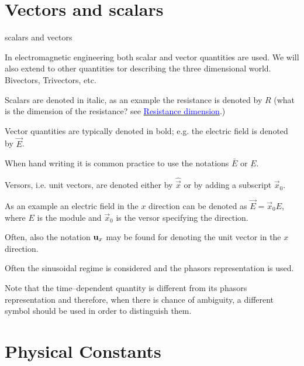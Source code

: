 \documentclass[10pt]{beamer}
\begin{document}
\section{Vectors and scalars}
\begin{frame}[fragile]{scalars and vectors}

In electromagnetic engineering both scalar and vector quantities are used. 
\alert{We will also extend to other quantities tor describing the three dimensional world. Bivectors, Trivectors, etc.}

Scalars are denoted in italic, as an example the resistance is denoted by $R$
(what is the dimension of the resistance? see
\href{http://www.ebyte.it/library/educards/sidimensions/SiDimensionsAlfaList.html}{\textcolor{blue}{Resistance dimension}}.)

Vector quantities are typically denoted in bold; e.g. the electric field is denoted by 
$\vec{E}$. 

When hand writing it is common practice to use the notations  $\bar{E}$ or $\underbar{E}$. 

Versors, i.e. unit vectors, are denoted either by $\hat{\vec{x}}$ or by adding a subscript ${\vec{x}_0}$. 


\end{frame}

\begin{frame}[fragile]{}
As an example an electric field in the $x$ direction can be denoted as $\vec{E}={\vec{x}_0}E$, where $E$ is the module and  ${\vec{x}_0}$ is the versor specifying the direction. 

Often, also the notation $\mathbf{u}_x$ may be found for denoting the unit vector in the $x$ direction.

Often the \alert{sinusoidal regime} is considered and the phasors representation is used. 

Note that \alert{the time--dependent quantity is different from its phasors representation} and therefore, when there is chance of ambiguity, a different symbol should be used in order to distinguish them.

\end{frame}

\section{Physical Constants}
\end{document}
